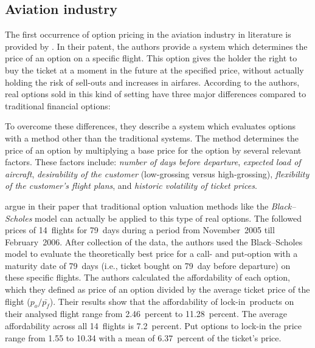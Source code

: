 \subsection{Aviation industry}
\label{subsec:AviationIndustry}
The first occurrence of option pricing in the aviation industry in literature is provided by . In their patent, the authors provide a system which determines the price of an option on a specific flight. This option gives the holder the right to buy the ticket at a moment in the future at the specified price, without actually holding the risk of sell-outs and increases in airfares. According to the authors, real options sold in this kind of setting have three major differences compared to traditional financial options:

To overcome these differences, they describe a system which evaluates options with a method other than the traditional systems. The method determines the price of an option by multiplying a base price for the option by several relevant factors. These factors include: \emph{number of days before departure}, \emph{expected load of aircraft}, \emph{desirability of the customer} (low-grossing versus high-grossing), \emph{flexibility of the customer's flight plans}, and \emph{historic volatility of ticket prices}. 

 argue in their paper that traditional option valuation methods like the \emph{Black--Scholes} model \cite{black1976pricing} can actually be applied to this type of real options. The followed prices of 14~flights for 79~days during a period from November~2005 till February~2006. After collection of the data, the authors used the Black--Scholes model to evaluate the theoretically best price for a call- and put-option with a maturity date of 79~days (i.e., ticket bought on 79~day before departure) on these specific flights. The authors calculated the affordability of each option, which they defined as price of an option divided by the average ticket price of the flight ($p_o/\bar{p_f}$). Their results show that the affordability of lock-in~products on their analysed flight range from 2.46~percent to 11.28~percent. The average affordability across all 14~flights is 7.2~percent. Put options to lock-in the price range from 1.55 to 10.34 with a mean of 6.37~percent of the ticket's price.


